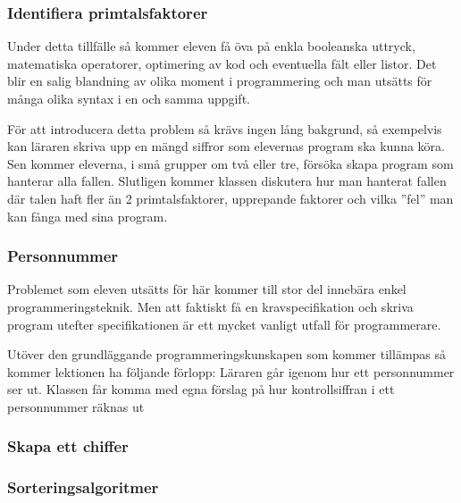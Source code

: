 \subsubsection{Identifiera primtalsfaktorer}
    \label{sec:primtal}
    
    \textcolor{WildStrawberry}{
        Under detta tillfälle så kommer eleven få öva på enkla booleanska uttryck, matematiska operatorer, optimering av kod och eventuella fält eller listor. Det blir en salig blandning av olika moment i programmering och man utsätts för många olika syntax i en och samma uppgift. }
        
    \textcolor{WildStrawberry}{
        För att introducera detta problem så krävs ingen lång bakgrund, så exempelvis kan läraren skriva upp en mängd siffror som elevernas program ska kunna köra. Sen kommer eleverna, i små grupper om två eller tre, försöka skapa program som hanterar alla fallen. Slutligen kommer klassen diskutera hur man hanterat fallen där talen haft fler än 2 primtalsfaktorer, upprepande faktorer och vilka ''fel'' man kan fånga med sina program. }

\subsubsection{Personnummer}
    \label{sec:Pnr}
    
    \textcolor{WildStrawberry}{
        Problemet som eleven utsätts för här kommer till stor del innebära enkel programmeringsteknik. Men att faktiskt få en kravspecifikation och skriva program utefter specifikationen är ett mycket vanligt utfall för programmerare. }
        
    \textcolor{WildStrawberry}{
        Utöver den grundläggande programmeringskunskapen som kommer tillämpas så kommer lektionen ha följande förlopp: Läraren går igenom hur ett personnummer ser ut. Klassen får komma med egna förslag på hur kontrollsiffran i ett personnummer räknas ut  }
        
        
    
    

\subsubsection{Skapa ett chiffer}
    \label{sec:chiffer}
    
\subsubsection{Sorteringsalgoritmer}
    \label{sec:sorteringsalgoritmer}